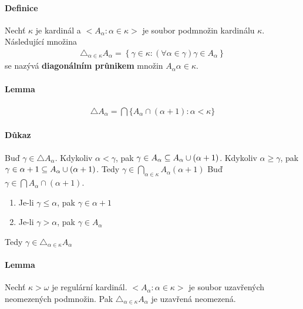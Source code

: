 \documentclass[a4paper,12pt,titlepage]{article}
\begin{document}
\paragraph{Definice}
Nechť $\kappa$ je kardinál a $<A_\alpha : \alpha \in \kappa>$ je soubor podmnožin
kardinálu $\kappa$. Následující množina 
\begin{align}
	\triangle_{\alpha \in \kappa} A_\alpha = \left\{ \gamma \in \kappa: (\forall
	\alpha \in \gamma) \gamma \in A_\alpha \right\}
\end{align}
se nazývá \textbf{diagonálním průnikem} množin $A_\alpha \alpha \in \kappa$.
\paragraph{Lemma}
\begin{align}
	\triangle A_\alpha = \bigcap \{ A_\alpha \cap (\alpha+1): \alpha < \kappa \}
\end{align}
\paragraph{Důkaz}
Buď $\gamma \in \triangle A_\alpha$. Kdykoliv $\alpha < \gamma$, pak $\gamma \in
A_\alpha \subseteq A_\alpha \cup (\alpha + 1)$. Kdykoliv $\alpha \ge \gamma$, pak
$\gamma \in \alpha+1 \subseteq A_\alpha \cup (\alpha+1)$. Tedy $\gamma \in
\bigcap_{\alpha \in \kappa} A_\alpha (\alpha+1)$
Buď $\gamma \in \bigcap A_\alpha \cap (\alpha+1)$.
\begin{enumerate}
	\item Je-li $\gamma \le \alpha$, pak $\gamma \in \alpha + 1$
	\item Je-li $\gamma > \alpha$, pak $\gamma \in A_\alpha$ 
\end{enumerate}
Tedy $\gamma \in \triangle_{\alpha \in \kappa} A_\alpha$
\paragraph{Lemma}
Nechť $\kappa > \omega$ je regulární kardinál. $<A_\alpha: \alpha \in\kappa>$ je
soubor uzavřených neomezených podmnožin. Pak $\triangle_{\alpha\in\kappa} A_\alpha$ je uzavřená
neomezená.
\end{document}
